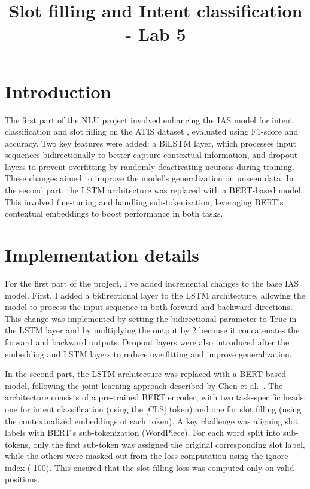 \documentclass[a4paper]{article}
\title{Slot filling and Intent classification  - Lab 5}
\begin{document}
\maketitle
%
%
\section{Introduction}
The first part of the NLU project involved enhancing the IAS model for intent 
classification and slot filling on the ATIS dataset \cite{nlu-labs-unitn}, evaluated using F1-score and
 accuracy. Two key features were added: a BiLSTM layer, which processes input 
 sequences bidirectionally to better capture contextual information, and dropout 
 layers to prevent overfitting by randomly deactivating neurons during training.
 These changes aimed to improve the model’s generalization on unseen data. In the 
 second part, the LSTM architecture was replaced with a BERT-based model. This 
 involved fine-tuning and handling sub-tokenization, leveraging BERT’s contextual
 embeddings to boost performance in both tasks.
\section{Implementation details}
For the first part of the project, I've added incremental changes to the base IAS model.
First, I added a bidirectional layer to the LSTM architecture, allowing the model to
process the input sequence in both forward and backward directions. 
This change was implemented by setting the bidirectional parameter to True in the LSTM layer and by multiplying the output
 by 2 because it concatenates the forward and backward outputs.
 Dropout layers were also introduced after the embedding and LSTM layers to reduce overfitting and improve generalization.

 In the second part, the LSTM architecture was replaced with a BERT-based model, following the joint learning approach described by Chen et al.~\cite{chen2019bertjointintentclassification}.
 The architecture consists of a pre-trained BERT encoder, with two task-specific heads: one for intent classification (using the [CLS] token) and one for slot filling (using the contextualized embeddings of each token).
 A key challenge was aligning slot labels with BERT’s sub-tokenization (WordPiece).
 For each word split into sub-tokens, only the first sub-token was assigned the original corresponding slot label, while the others were masked out from the loss computation using the ignore index (-100).
 This ensured that the slot filling loss was computed only on valid positions.
 
\end{document}
